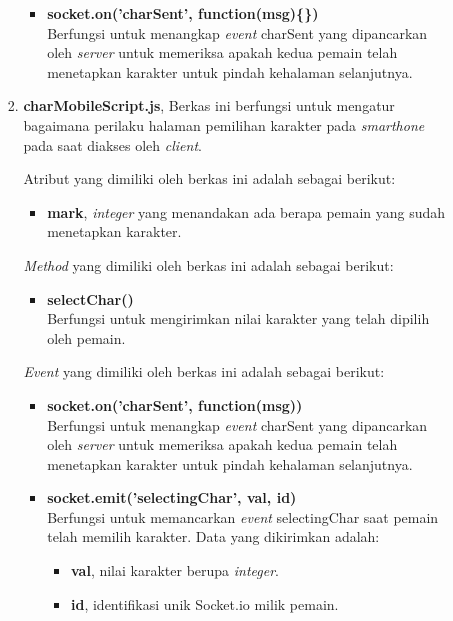 \begin{enumerate}
\begin{enumerate}
\begin{enumerate}
\begin{itemize}
				\item \textbf{socket.on('charSent', function(msg)\{\})} \\
				Berfungsi untuk menangkap \textit{event} charSent yang dipancarkan oleh \textit{server} untuk memeriksa apakah kedua pemain telah menetapkan karakter untuk pindah kehalaman selanjutnya.
			\end{itemize}
			
			\item \textbf{charMobileScript.js}, Berkas ini berfungsi untuk mengatur bagaimana perilaku halaman pemilihan karakter pada \textit{smarthone} pada saat diakses oleh \textit{client}.
			
			Atribut yang dimiliki oleh berkas ini adalah sebagai berikut:
			\begin{itemize}
				\item \textbf{mark}, \textit{integer} yang menandakan ada berapa pemain yang sudah menetapkan karakter.
			\end{itemize}
		
			\textit{Method} yang dimiliki oleh berkas ini adalah sebagai berikut:
			\begin{itemize}
				\item \textbf{selectChar()} \\
				Berfungsi untuk mengirimkan nilai karakter yang telah dipilih oleh pemain.
			\end{itemize}
			
			\textit{Event} yang dimiliki oleh berkas ini adalah sebagai berikut:
			\begin{itemize}
				\item \textbf{socket.on('charSent', function(msg){})} \\ 
				Berfungsi untuk menangkap \textit{event} charSent yang dipancarkan oleh \textit{server} untuk memeriksa apakah kedua pemain telah menetapkan karakter untuk pindah kehalaman selanjutnya.
				
				\item \textbf{socket.emit('selectingChar', {val, id})} \\
				Berfungsi untuk memancarkan \textit{event} selectingChar saat pemain telah memilih karakter. Data yang dikirimkan adalah:
				\begin{itemize}
					\item \textbf{val}, nilai karakter berupa \textit{integer}.
					\item \textbf{id}, identifikasi unik Socket.io milik pemain.
				\end{itemize}
			

\end{itemize}
\end{enumerate}
\end{enumerate}
\end{enumerate}
